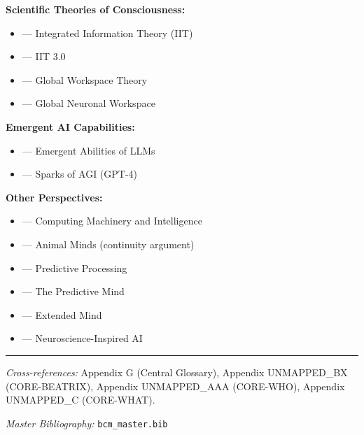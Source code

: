 \textbf{Scientific Theories of Consciousness:}
\begin{itemize}[nosep]
    \item \citet{tononi2004information} --- Integrated Information Theory (IIT)
    \item \citet{tononi2016integrated} --- IIT 3.0
    \item \citet{baars1988cognitive} --- Global Workspace Theory
    \item \citet{dehaene2011experimental} --- Global Neuronal Workspace
\end{itemize}

\textbf{Emergent AI Capabilities:}
\begin{itemize}[nosep]
    \item \citet{wei2022emergent} --- Emergent Abilities of LLMs
    \item \citet{bubeck2023sparks} --- Sparks of AGI (GPT-4)
\end{itemize}

\textbf{Other Perspectives:}
\begin{itemize}[nosep]
    \item \citet{turing1950computing} --- Computing Machinery and Intelligence
    \item \citet{griffin1992animal} --- Animal Minds (continuity argument)
    \item \citet{clark2015surfing} --- Predictive Processing
    \item \citet{hohwy2013predictive} --- The Predictive Mind
    \item \citet{clark1998extended} --- Extended Mind
    \item \citet{hassabis2017neuroscience} --- Neuroscience-Inspired AI
\end{itemize}

\nocite{bcm_master}



\vspace{1em}
\hrule
\vspace{0.5em}

\noindent\textit{Cross-references:}
Appendix G (Central Glossary),
Appendix UNMAPPED_BX (CORE-BEATRIX),
Appendix UNMAPPED_AAA (CORE-WHO),
Appendix UNMAPPED_C (CORE-WHAT).

\noindent\textit{Master Bibliography:} \texttt{bcm\_master.bib}


